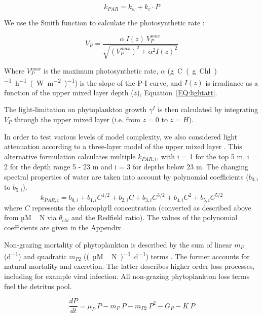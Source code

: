 \documentclass[journal abbreviation, manuscript]{copernicus}
\begin{document}
\begin{equation}
    k_{PAR} = k_w + k_c \cdot P
    \label{EQ:beerslaw}
\end{equation}

We use the Smith function to calculate the photosynthetic rate \citep{Anderson1993APhotosynthesis}:

\begin{equation}
    V_P = \frac{\alpha ~ I(z) ~ V_P^{max}}{\sqrt{(V_P^{max})^2 + \alpha^2 I(z)^2}}
\end{equation}

Where $V_P^{max}$ is the maximum photosynthetic rate, $\alpha$ (\unit{g C (g Chl)^{-1} h^{-1} (W m^{-2})^{-1}}) is the slope of the P-I curve, and $I(z)$ is irradiance as a function of the upper mixed layer depth ($z$), Equation~\ref{EQ:lightatt}.



The light-limitation on phytoplankton growth $\gamma^{I}$ is then calculated by integrating $V_P$ through the upper mixed layer (i.e. from $z=0$ to $z=H$).

In order to test various levels of model complexity, we also considered light attenuation according to a three-layer model of the upper mixed layer \citep{Anderson1993APhotosynthesis}. This alternative formulation calculates multiple $k_{PAR, i}$, with i = 1 for the top 5 \unit{m}, i = 2 for the depth range 5 - 23 \unit{m} and i = 3 for depths below 23 \unit{m}. The changing spectral properties of water are taken into account by polynomial coefficients ($b_{0,i}$ to $b_{5,i}$).
\begin{equation}
    k_{PAR, i} = b_{0,i} + b_{1,i} C^{1/2} + b_{2,i} C + b_{3,i} C^{3/2} + b_{4,i} C^2 + b_{5,i} C^{5/2}
    \label{EQ:piecewiselight}
\end{equation}
where $C$ represents the chlorophyll concentration (converted as described above from \unit{µM\,N} via $\theta_{chl}$ and the Redfield ratio). The values of the polynomial coefficients are given in the Appendix.

Non-grazing mortality of phytoplankton is described by the sum of linear $m_P$ (\unit{d^{-1}}) and quadratic $m_{P2}$ (\unit{(µM\,N)^{-1} d^{−1}}) terms \citep{Yool2011Medusa-1.0:Domain}. The former accounts for natural mortality and excretion. The latter describes higher order loss processes, including for example viral infection. All non-grazing phytoplankton loss terms fuel the detritus pool.

\begin{equation}
    \frac{d P}{d t} =
    \mu_{P} \ P  %
    - m_P \ P %
    - m_{P2} \ P^2 %
    - G_P %
    - K \ P %
\end{equation}
\end{document}
